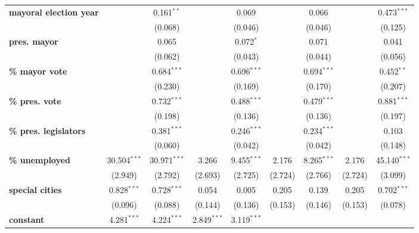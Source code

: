 \begin{sidewaystable}[!htbp]
{\begin{threeparttable}
\begin{tabular}{lcccccccc}
\textbf{mayoral election year}             &               & 0.161$^{**}$ &               & 0.069        &               & 0.066         &               & 0.473$^{***}$\tabularnewline
                                  &               & (0.068)      &               & (0.046)      &               & (0.046)       &               & (0.125)\tabularnewline
\textbf{pres. mayor}                       &               & 0.065        &               & 0.072$^{*}$  &               & 0.071         &               & 0.041\tabularnewline
                                  &               & (0.062)      &               & (0.043)      &               & (0.044)       &               & (0.056)\tabularnewline
\textbf{\% mayor vote}                     &               & 0.684$^{***}$&               & 0.696$^{***}$&               & 0.694$^{***}$ &               & 0.452$^{**}$\tabularnewline
                                  &               & (0.230)      &               & (0.169)      &               & (0.170)       &               & (0.207)\tabularnewline
\textbf{\% pres. vote}                     &               & 0.732$^{***}$&               &0.488$^{***}$ &               & 0.479$^{***}$ &               & 0.881$^{***}$\tabularnewline
                                  &               & (0.198)      &               & (0.136)      &               & (0.136)       &               & (0.197)\tabularnewline
\textbf{\% pres. legislators}              &               & 0.381$^{***}$&               &0.246$^{***}$ &               & 0.234$^{***}$ &               & 0.103\tabularnewline
                                  &               & (0.060)      &               & (0.042)      &               & (0.042)       &               & (0.148)\tabularnewline
\textbf{\% unemployed}                     &30.504$^{***}$ &30.971$^{***}$& 3.266         &9.455$^{***}$ & 2.176         & 8.265$^{***}$ & 2.176         & 45.140$^{***}$\tabularnewline
                                  & (2.949)       & (2.792)      & (2.693)       & (2.725)      & (2.724)       & (2.766)       & (2.724)       & (3.099)\tabularnewline
\textbf{special cities}                    &0.828$^{***}$  & 0.728$^{***}$& 0.054         &  0.005       & 0.205         & 0.139         & 0.205         & 0.702$^{***}$\tabularnewline
                                  & (0.096)       & (0.088)      & (0.144)       & (0.136)      & (0.153)       & (0.146)       & (0.153)       & (0.078)\tabularnewline
\textbf{constant}                          & 4.281$^{***}$ & 4.224$^{***}$& 2.849$^{***}$ & 3.119$^{***}$&               &               &               & \tabularnewline

\end{tabular}
\end{threeparttable}}
\end{sidewaystable}
